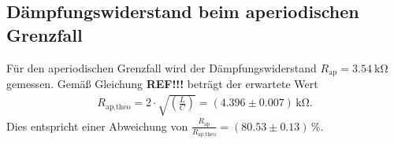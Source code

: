 \subsection{Dämpfungswiderstand beim aperiodischen Grenzfall}
Für den aperiodischen Grenzfall wird der Dämpfungswiderstand $R_\text{ap} = \qty{3.54}{\kilo\ohm}$ gemessen.
Gemäß Gleichung \textbf{REF!!!} beträgt der erwartete Wert 
\begin{align}
    R_\text{ap,theo} = 2 \cdot \sqrt{\left(\frac{L}{C}\right)} =  (\num{4.396} \pm \num{0.007}) \, \unit{\kilo\ohm}.
\end{align}
Dies entspricht einer Abweichung von $ \frac{R_\text{ap}}{R_\text{ap,theo}} = (\num{80.53} \pm \num{0.13}) \, \%$.

